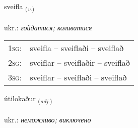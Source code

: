 \documentclass[frontgrid, backgrid]{flacards}\usepackage[]{graphicx}\usepackage[]{xcolor}
\begin{document}
\renewcommand{\flhead}{\vskip5pt \fboxsep=0pt {\small\bfseries\footnotesize Sagnorð | дієслово}}
\renewcommand{\fcfoot}{\vskip5pt \fboxsep=0pt \hspace{2pt}{\small\bfseries\footnotesize 3K}}

\renewcommand{\blhead}{\vskip5pt {\small\bfseries\footnotesize Sagnorð | дієслово }}
\renewcommand{\bcfoot}{\vskip5pt \hspace{2pt}{\small\bfseries\footnotesize 3K}}


{sveifla \small{\textsubscript{(\textit{v.})}} \\[1ex] %
\textphonetic{[sveipla]} \\
ukr.: \emph{гойдатися; коливатися} \\  [2ex]
\renewcommand*{\arraystretch}{0.8}
\begin{tabular}{p{1cm}l}
\textsc{1sg}: & sveifla -- sveiflaði -- sveiflað \\ 
\textsc{2sg}: & sveiflar -- sveiflaðir -- sveiflað \\ 
\textsc{3sg}: & sveiflar -- sveiflaði -- sveiflað \\ 
\end{tabular}
}

\renewcommand{\flhead}{\vskip5pt \fboxsep=0pt {\small\bfseries\footnotesize Lýsingarorð | прикметник}}
\renewcommand{\fcfoot}{\vskip5pt \fboxsep=0pt \hspace{2pt}{\small\bfseries\footnotesize 3K}}

\renewcommand{\blhead}{\vskip5pt {\small\bfseries\footnotesize Lýsingarorð | прикметник }}
\renewcommand{\bcfoot}{\vskip5pt \hspace{2pt}{\small\bfseries\footnotesize 3K}}


{útilokaður \small{\textsubscript{(\textit{adj.})}} \\[1ex] %
\textphonetic{[uːtɪlɔkaðʏr]} \\
ukr.: \emph{неможливо; виключено} \\  [2ex]
\renewcommand*{\arraystretch}{0.8}
}
\end{document}
